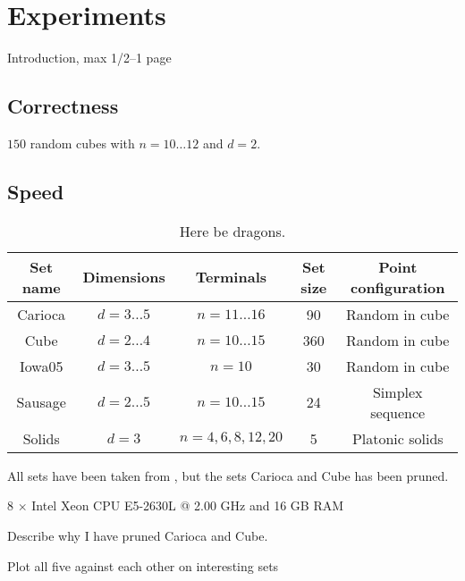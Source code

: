 {
\abnormalparskip{0pt}
\chapter{Experiments}
\label{cha:experiments}
}

Introduction, max 1/2--1 page

\section{Correctness}
\label{sec:correctness}

$150$ random cubes with $n = 10 \ldots 12$ and $d = 2$.

\section{Speed}
\label{sec:speed}

\begin{table}[htbp]
  \centering
  \begin{tabular}{ccccc}
    \toprule
    Set name & Dimensions       & Terminals             & Set size & Point configuration \\
    \midrule
    Carioca  & $d = 3 \ldots 5$ & $n = 11 \ldots 16$    & 90       & Random in cube      \\
    Cube     & $d = 2 \ldots 4$ & $n = 10 \ldots 15$    & 360      & Random in cube      \\
    Iowa05   & $d = 3 \ldots 5$ & $n = 10$              & 30       & Random in cube      \\
    Sausage  & $d = 2 \ldots 5$ & $n = 10 \ldots 15$    & 24       & Simplex sequence    \\
    Solids   & $d = 3$          & $n = 4, 6, 8, 12, 20$ & 5        & Platonic solids     \\
    \bottomrule
  \end{tabular}
  \caption[Here be dragons]{Here be dragons.\label{tab:test-sets}}
\end{table}

All sets have been taken from \textcite{fonseca2014}, but the sets Carioca and
Cube has been pruned.

8 $\times$ Intel\textsuperscript{\textregistered}
Xeon\textsuperscript{\textregistered} CPU E5-2630L @ 2.00 GHz and 16 GB RAM

Describe why I have pruned Carioca and Cube.

Plot all five against each other on interesting sets

